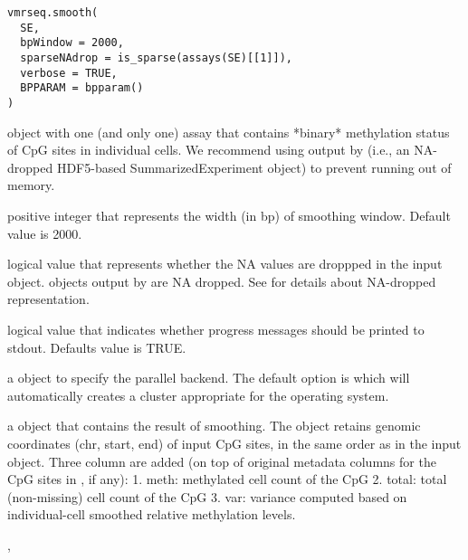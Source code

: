 \documentclass[letterpaper]{book}
\begin{document}
%
\begin{Usage}
\begin{verbatim}
vmrseq.smooth(
  SE,
  bpWindow = 2000,
  sparseNAdrop = is_sparse(assays(SE)[[1]]),
  verbose = TRUE,
  BPPARAM = bpparam()
)
\end{verbatim}
\end{Usage}
%
\begin{Arguments}
\begin{ldescription}
\item[\code{SE}]  object with one (and only one) assay that
contains *binary* methylation status of CpG sites in individual cells. We
recommend using output by  (i.e., an NA-dropped
HDF5-based SummarizedExperiment object) to prevent running out of memory.

\item[\code{bpWindow}] positive integer that represents the width (in bp) of
smoothing window. Default value is 2000.

\item[\code{sparseNAdrop}] logical value that represents whether the NA values are
droppped in the input  object.  objects output by
 are NA dropped. See 
for details about NA-dropped representation.

\item[\code{verbose}] logical value that indicates whether progress messages
should be printed to stdout. Defaults value is TRUE.

\item[\code{BPPARAM}] a  object to specify the parallel
backend. The default option is  which will
automatically creates a cluster appropriate for the operating system.
\end{ldescription}
\end{Arguments}
%
\begin{Value}
a  object that contains the result of smoothing.
The object retains genomic coordinates (chr, start, end) of input CpG
sites, in the same order as in the input  object. Three
column are added (on top of original metadata columns for the CpG sites in
, if any):
1. meth: methylated cell count of the CpG
2. total: total (non-missing) cell count of the CpG
3. var: variance computed based on individual-cell smoothed relative methylation levels.
\end{Value}
%
\begin{SeeAlso}
, 
\end{SeeAlso}
\printindex{}
\end{document}

